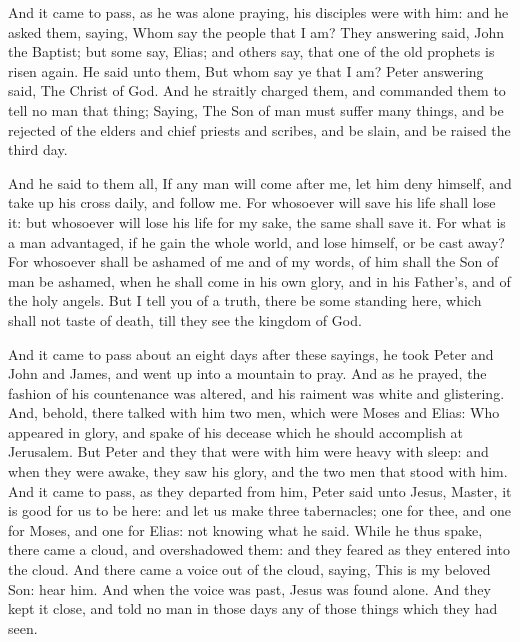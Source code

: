  And it came to pass, as he was alone praying, his
disciples were with him: and he asked them, saying, Whom say the people
that I am?  They answering said, John the Baptist; but
some say, Elias; and others say, that one of the old prophets is risen
again.  He said unto them, But whom say ye that I am?
Peter answering said, The Christ of God.  And he straitly
charged them, and commanded them to tell no man that thing;
 Saying, The Son of man must suffer many things, and be
rejected of the elders and chief priests and scribes, and be slain, and
be raised the third day.

 And he said to them all, If any man will come after me,
let him deny himself, and take up his cross daily, and follow me.
 For whosoever will save his life shall lose it: but
whosoever will lose his life for my sake, the same shall save it.
 For what is a man advantaged, if he gain the whole
world, and lose himself, or be cast away?  For whosoever
shall be ashamed of me and of my words, of him shall the Son of man be
ashamed, when he shall come in his own glory, and in his Father's, and
of the holy angels.  But I tell you of a truth, there be
some standing here, which shall not taste of death, till they see the
kingdom of God.

 And it came to pass about an eight days after these
sayings, he took Peter and John and James, and went up into a mountain
to pray.  And as he prayed, the fashion of his
countenance was altered, and his raiment was white and glistering.
 And, behold, there talked with him two men, which were
Moses and Elias:  Who appeared in glory, and spake of his
decease which he should accomplish at Jerusalem.  But
Peter and they that were with him were heavy with sleep: and when they
were awake, they saw his glory, and the two men that stood with him.
 And it came to pass, as they departed from him, Peter
said unto Jesus, Master, it is good for us to be here: and let us make
three tabernacles; one for thee, and one for Moses, and one for Elias:
not knowing what he said.  While he thus spake, there
came a cloud, and overshadowed them: and they feared as they entered
into the cloud.  And there came a voice out of the cloud,
saying, This is my beloved Son: hear him.  And when the
voice was past, Jesus was found alone. And they kept it close, and told
no man in those days any of those things which they had seen.

